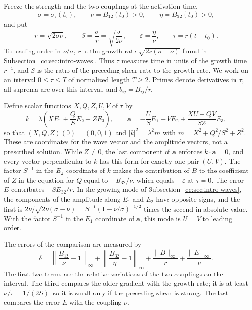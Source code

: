 Freeze the strength and the two couplings at the activation time,
\[
 \sigma=\sigma_\sharp(t_0),\qquad \nu=B_{12}(t_0)>0,\qquad
 \eta=B_{32}(t_0)>0,
\]
and put
\[
 r=\sqrt{2\sigma\nu},\qquad S=\frac\sigma r=\sqrt{\frac{\sigma}{2\nu}},\qquad
 \varepsilon=\frac\eta\nu,\qquad \tau=r(t-t_0).
\]
To leading order in $\nu/\sigma$, $r$ is the growth rate
$\sqrt{2\nu(\sigma-\nu)}$ found in Subsection~\ref{cc:sec:intro-waves}. Thus
$\tau$ measures time in units of the growth time $r^{-1}$, and $S$ is
the ratio of the preceding shear rate to the growth rate. We work on an
interval $0\le\tau\le T$ of normalized length $T\ge2$. Primes denote
derivatives in $\tau$, all suprema are over this interval, and
$b_{ij}=B_{ij}/r$.

Define scalar functions $X,Q,Z,U,V$ of $\tau$ by
\begin{equation}\label{cc:eq:scaled-pair}
 k=\lambda\left(XE_1+\frac QSE_2+ZE_3\right),\qquad
 \mathbf a=-\frac USE_1+VE_2+\frac{XU-QV}{SZ}E_3 ,
\end{equation}
so that $(X,Q,Z)(0)=(0,0,1)$ and $|k|^2=\lambda^2m$ with
$m=X^2+Q^2/S^2+Z^2$. These are coordinates for the wave vector and the
amplitude vectors, not a prescribed solution. While $Z\ne0$, the last
component of $\mathbf a$ enforces $k\cdot\mathbf a=0$, and every vector
perpendicular to $k$ has this form for exactly one pair $(U,V)$. The
factor $S^{-1}$ in the $E_2$ coordinate of $k$ makes the contribution
of $B$ to the coefficient of $Z$ in the equation for $Q$ equal to
$-B_{32}/\nu$, which equals $-\varepsilon$ at $\tau=0$. The error $E$
contributes $-SE_{32}/r$. In the growing mode of
Subsection~\ref{cc:sec:intro-waves}, the components of the amplitude along $E_1$ and $E_2$
have opposite signs, and the first is
$2\nu/\sqrt{2\nu(\sigma-\nu)}=S^{-1}(1-\nu/\sigma)^{-1/2}$ times the
second in absolute value. With the
factor $S^{-1}$ in the $E_1$ coordinate of $\mathbf a$, this mode is
$U=V$ to leading order.

The errors of the comparison are measured by
\begin{equation}\label{cc:uf:exact:eq:additive-error}
 \delta=\left\|\frac{B_{12}}{\nu}-1\right\|_\infty
       +\left\|\frac{B_{32}}{\eta}-1\right\|_\infty
       +\frac{\|B\|_\infty}{r}+\frac{\|E\|_\infty}{\nu}.
\end{equation}
The first two terms are the relative variations of the two couplings on
the interval. The third compares the older gradient with the growth
rate; it is at least $\nu/r=1/(2S)$, so it is small only if the
preceding shear is strong. The last compares the error $E$ with the
coupling $\nu$.


